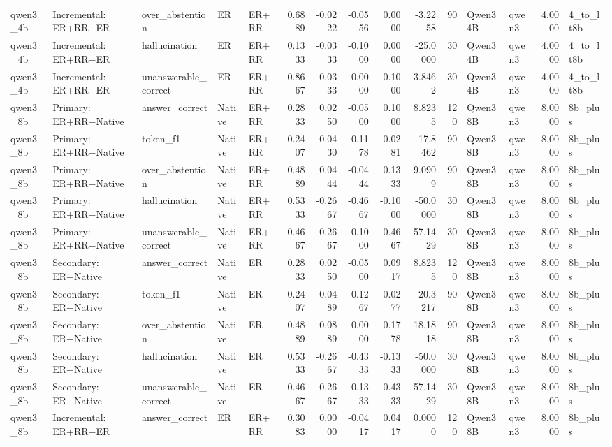 \begin{tabular}{lllllrrrrrrllrl}
qwen3_4b & Incremental: ER+RR−ER & over_abstention & ER & ER+RR & 0.6889 & -0.0222 & -0.0556 & 0.0000 & -3.2258 & 90 & Qwen3 4B & qwen3 & 4.0000 & 4_to_lt8b \\
qwen3_4b & Incremental: ER+RR−ER & hallucination & ER & ER+RR & 0.1333 & -0.0333 & -0.1000 & 0.0000 & -25.0000 & 30 & Qwen3 4B & qwen3 & 4.0000 & 4_to_lt8b \\
qwen3_4b & Incremental: ER+RR−ER & unanswerable_correct & ER & ER+RR & 0.8667 & 0.0333 & 0.0000 & 0.1000 & 3.8462 & 30 & Qwen3 4B & qwen3 & 4.0000 & 4_to_lt8b \\
qwen3_8b & Primary: ER+RR−Native & answer_correct & Native & ER+RR & 0.2833 & 0.0250 & -0.0500 & 0.1000 & 8.8235 & 120 & Qwen3 8B & qwen3 & 8.0000 & 8b_plus \\
qwen3_8b & Primary: ER+RR−Native & token_f1 & Native & ER+RR & 0.2407 & -0.0430 & -0.1178 & 0.0281 & -17.8462 & 90 & Qwen3 8B & qwen3 & 8.0000 & 8b_plus \\
qwen3_8b & Primary: ER+RR−Native & over_abstention & Native & ER+RR & 0.4889 & 0.0444 & -0.0444 & 0.1333 & 9.0909 & 90 & Qwen3 8B & qwen3 & 8.0000 & 8b_plus \\
qwen3_8b & Primary: ER+RR−Native & hallucination & Native & ER+RR & 0.5333 & -0.2667 & -0.4667 & -0.1000 & -50.0000 & 30 & Qwen3 8B & qwen3 & 8.0000 & 8b_plus \\
qwen3_8b & Primary: ER+RR−Native & unanswerable_correct & Native & ER+RR & 0.4667 & 0.2667 & 0.1000 & 0.4667 & 57.1429 & 30 & Qwen3 8B & qwen3 & 8.0000 & 8b_plus \\
qwen3_8b & Secondary: ER−Native & answer_correct & Native & ER & 0.2833 & 0.0250 & -0.0500 & 0.0917 & 8.8235 & 120 & Qwen3 8B & qwen3 & 8.0000 & 8b_plus \\
qwen3_8b & Secondary: ER−Native & token_f1 & Native & ER & 0.2407 & -0.0489 & -0.1267 & 0.0277 & -20.3217 & 90 & Qwen3 8B & qwen3 & 8.0000 & 8b_plus \\
qwen3_8b & Secondary: ER−Native & over_abstention & Native & ER & 0.4889 & 0.0889 & 0.0000 & 0.1778 & 18.1818 & 90 & Qwen3 8B & qwen3 & 8.0000 & 8b_plus \\
qwen3_8b & Secondary: ER−Native & hallucination & Native & ER & 0.5333 & -0.2667 & -0.4333 & -0.1333 & -50.0000 & 30 & Qwen3 8B & qwen3 & 8.0000 & 8b_plus \\
qwen3_8b & Secondary: ER−Native & unanswerable_correct & Native & ER & 0.4667 & 0.2667 & 0.1333 & 0.4333 & 57.1429 & 30 & Qwen3 8B & qwen3 & 8.0000 & 8b_plus \\
qwen3_8b & Incremental: ER+RR−ER & answer_correct & ER & ER+RR & 0.3083 & 0.0000 & -0.0417 & 0.0417 & 0.0000 & 120 & Qwen3 8B & qwen3 & 8.0000 & 8b_plus \\

\end{tabular}
